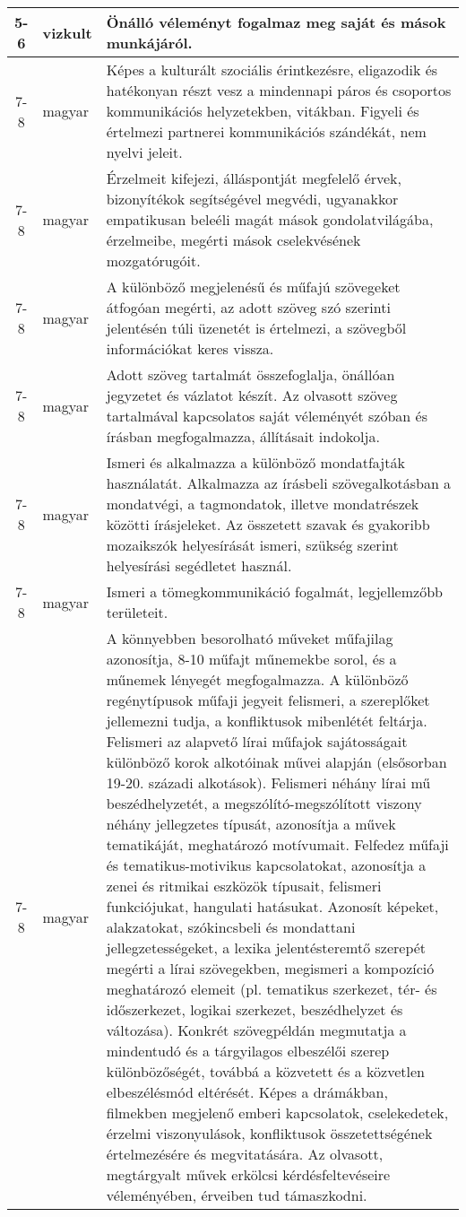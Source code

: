 \begin{small}
\begin{longtable}{c | p{2cm} |  p{11cm} }
              5-6 & vizkult & Önálló véleményt fogalmaz meg saját és mások munkájáról. \\ \hline
              7-8 & magyar & Képes a kulturált szociális érintkezésre, eligazodik és hatékonyan részt vesz a mindennapi páros és csoportos kommunikációs helyzetekben, vitákban. Figyeli és értelmezi partnerei kommunikációs szándékát, nem nyelvi jeleit.  \\ \hline
              7-8 & magyar & Érzelmeit kifejezi, álláspontját megfelelő érvek, bizonyítékok segítségével megvédi, ugyanakkor empatikusan beleéli magát mások gondolatvilágába, érzelmeibe, megérti mások cselekvésének mozgatórugóit. \\ \hline
              7-8 & magyar & A különböző megjelenésű és műfajú szövegeket átfogóan megérti, az adott szöveg szó szerinti jelentésén túli üzenetét is értelmezi, a szövegből információkat keres vissza. \\ \hline
              7-8 & magyar & Adott szöveg tartalmát összefoglalja, önállóan jegyzetet és vázlatot készít. Az olvasott szöveg tartalmával kapcsolatos saját véleményét szóban és írásban megfogalmazza, állításait indokolja. \\ \hline
              7-8 & magyar & Ismeri és alkalmazza a különböző mondatfajták használatát. Alkalmazza az írásbeli szövegalkotásban a mondatvégi, a tagmondatok, illetve mondatrészek közötti írásjeleket. Az összetett szavak és gyakoribb mozaikszók helyesírását ismeri, szükség szerint helyesírási segédletet használ. \\ \hline
              7-8 & magyar & Ismeri a tömegkommunikáció fogalmát, legjellemzőbb területeit. \\ \hline
              7-8 & magyar & A könnyebben besorolható műveket műfajilag azonosítja, 8-10 műfajt műnemekbe sorol, és a műnemek lényegét megfogalmazza. A különböző regénytípusok műfaji jegyeit felismeri, a szereplőket jellemezni tudja, a konfliktusok mibenlétét feltárja. Felismeri az alapvető lírai műfajok sajátosságait különböző korok alkotóinak művei alapján (elsősorban 19-20. századi alkotások). Felismeri néhány lírai mű beszédhelyzetét, a megszólító-megszólított viszony néhány jellegzetes típusát, azonosítja a művek tematikáját, meghatározó motívumait. Felfedez műfaji és tematikus-motivikus kapcsolatokat, azonosítja a zenei és ritmikai eszközök típusait, felismeri funkciójukat, hangulati hatásukat. Azonosít képeket, alakzatokat, szókincsbeli és mondattani jellegzetességeket, a lexika jelentésteremtő szerepét megérti a lírai szövegekben, megismeri a kompozíció meghatározó elemeit (pl. tematikus szerkezet, tér- és időszerkezet, logikai szerkezet, beszédhelyzet és változása). Konkrét szövegpéldán megmutatja a mindentudó és a tárgyilagos elbeszélői szerep különbözőségét, továbbá a közvetett és a közvetlen elbeszélésmód eltérését. Képes a drámákban, filmekben megjelenő emberi kapcsolatok, cselekedetek, érzelmi viszonyulások, konfliktusok összetettségének értelmezésére és megvitatására. Az olvasott, megtárgyalt művek erkölcsi kérdésfeltevéseire véleményében, érveiben tud támaszkodni. \\ \hline

\end{longtable}
\end{small}
